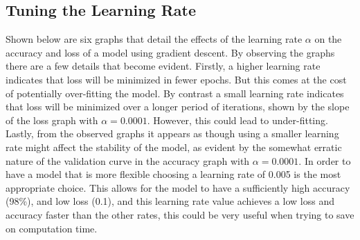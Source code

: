 \documentclass[12pt]{article}
\begin{document}
\subsection{Tuning the Learning Rate}
Shown below are six graphs that detail the effects of the learning rate $\alpha$ on the
accuracy and loss of a model using gradient descent. By observing the graphs there are a few
details that become evident. Firstly, a higher learning rate indicates that loss will be minimized
in fewer epochs. But this comes at the cost of potentially over-fitting the model. By contrast a
small learning rate indicates that loss will be minimized over a longer period of iterations, shown
by the slope of the loss graph with $\alpha = 0.0001$. However, this could lead to under-fitting. Lastly,
from the observed graphs it appears as though using a smaller learning rate might affect the stability of the
model, as evident by the somewhat erratic nature of the validation curve in the accuracy graph with
$\alpha = 0.0001$.
In order to have a model that is more flexible choosing a learning rate of 0.005 is the most appropriate
choice. This allows for the model to have a sufficiently high accuracy (98\%), and low loss (0.1), and this
learning rate value achieves a low loss and accuracy faster than the other rates, this could be very useful
when trying to save on computation time.
\end{document}

